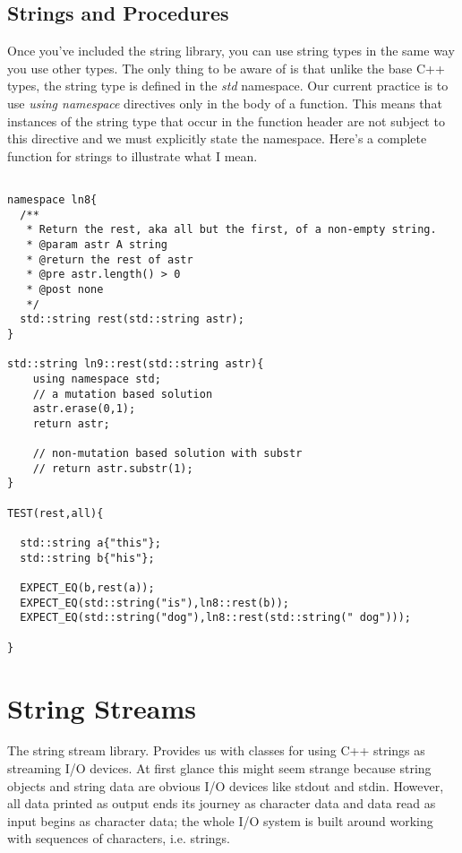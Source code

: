 \documentclass[]{tufte-handout}
\begin{document}
\subsection{Strings and Procedures}

Once you've included the string library, you can use string types in the same way you use other types. The only thing to be aware of is that unlike the base C++ types, the string type is defined in the \textit{std} namespace. Our current practice is to use \textit{using namespace} directives only in the body of a function. This means that instances of the string type that occur in the function header are not subject to this directive and we must explicitly state the namespace. Here's a complete function for strings to illustrate what I mean.

\begin{verbatim}

namespace ln8{
  /**
   * Return the rest, aka all but the first, of a non-empty string.
   * @param astr A string
   * @return the rest of astr
   * @pre astr.length() > 0
   * @post none
   */
  std::string rest(std::string astr);
}

std::string ln9::rest(std::string astr){
	using namespace std;	
	// a mutation based solution
	astr.erase(0,1);
	return astr;
	
	// non-mutation based solution with substr
	// return astr.substr(1);		 
}

TEST(rest,all){
  
  std::string a{"this"};
  std::string b{"his"};

  EXPECT_EQ(b,rest(a));
  EXPECT_EQ(std::string("is"),ln8::rest(b));
  EXPECT_EQ(std::string("dog"),ln8::rest(std::string(" dog")));	  
  
}

\end{verbatim}


\section{String Streams}


The string stream library.  Provides us with classes for using C++ strings as streaming I/O devices. At first glance this might seem strange because string objects and string data are obvious I/O devices like stdout and stdin. However, all data printed as output ends its journey as character data and data read as input begins as character data; the whole I/O system is built around working with sequences of characters, i.e. strings.
\end{document}
